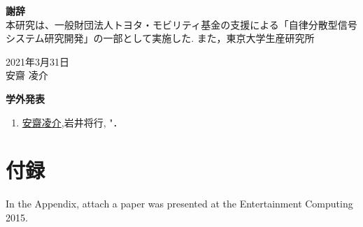 \newpage
\pagestyle{plain}


\begin{flushleft}
{\huge{\bf 謝辞}}\\
 \vspace{1cm}
 本研究は、一般財団法人トヨタ・モビリティ基金の支援による「自律分散型信号システム研究開発」の一部として実施した.
 また，東京大学生産研究所
\vspace{3cm}
\begin{flushright}
2021年3月31日\\
安齋 凌介\\
\end{flushright}
\end{flushleft}



\newpage




\begin{flushleft}
{\huge{\bf 学外発表}}\\
\vspace{1cm}
\begin{enumerate}

\item \underline{安齋凌介},岩井将行, "．


\end{enumerate}
\end{flushleft}

\newpage

\renewcommand{\bibname}{参考文献}







\newpage
\chapter*{付録}\label{huroku}

\begin{flushleft}
In the Appendix, attach a paper was presented at the Entertainment Computing 2015.
\end{flushleft}

\newpage

\pagestyle{empty}

